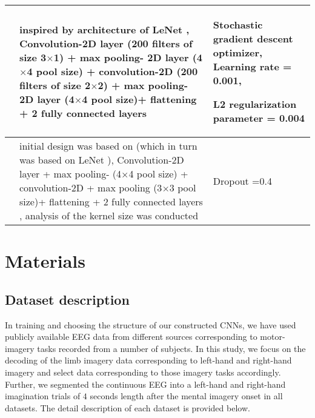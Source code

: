 \documentclass{ieeeaccess}
\begin{document}
\begin{table*}
\begin{tabular}{|p{0.6cm}|p{9cm}|p{5cm}|}
            \cite{zhang2019novelx} &  inspired by architecture of LeNet \cite{lecun1998gradient},  Convolution-2D layer (200 filters of  size 3$\times$1) + max pooling- 2D layer (4$\times$4 pool size) + convolution-2D (200 filters of  size 2$\times$2) + max pooling- 2D layer (4$\times$4 pool size)+ flattening + 2 fully connected layers & Stochastic gradient descent optimizer, Learning rate = 0.001,\par L2 regularization parameter = 0.004\\
            \hline
            
            \cite{ortiz2019new} & initial design was based on \cite{zhang2019novelx} (which in turn was based on LeNet \cite{lecun1998gradient}), Convolution-2D layer + max pooling- (4$\times$4 pool size) + convolution-2D  + max pooling (3$\times$3 pool size)+ flattening + 2 fully connected layers , analysis of the kernel size was conducted & Dropout =0.4 \\
            \hline    
        \end{tabular}
        \label{tab1}    
    \end{table*}      
    
    \section{Materials}
    \subsection{Dataset description}
    \label{sec:matmethods}
    In training and choosing the structure of our constructed CNNs, we have used publicly available EEG data from different sources corresponding to motor-imagery tasks recorded from a number of subjects. In this study, we focus on the decoding of the limb imagery data corresponding to left-hand and right-hand imagery and select data corresponding to those imagery tasks accordingly.  {Further, we segmented the continuous EEG into a left-hand and right-hand imagination trials of $4$ seconds length after the mental imagery onset in all datasets.} The detail description of each dataset is provided below.  

    
\end{document}
